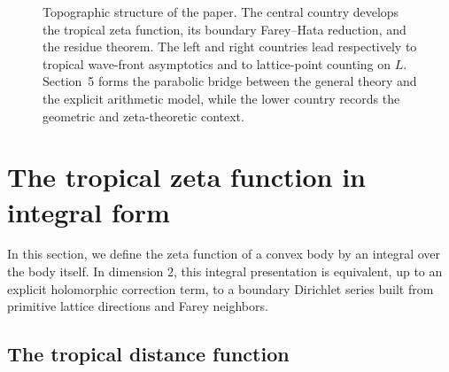 \documentclass[a4paper,american,11pt]{amsart}
\theoremstyle{plain}
\theoremstyle{definition}
\begin{document}
\begin{landscape}
\begin{figure}[p]
{%
}

\caption[Topographic structure of the paper]{
Topographic structure of the paper. The central country develops the tropical
zeta function, its boundary Farey--Hata reduction, and the residue theorem.
The left and right countries lead respectively to tropical wave-front
asymptotics and to lattice-point counting on \(L\). Section~5 forms the
parabolic bridge between the general theory and the explicit arithmetic
model, while the lower country records the geometric and zeta-theoretic
context.
}
\label{fig:structureofpaper}

\end{figure}
\endgroup
\end{landscape}
\clearpage

\section{The tropical zeta function in integral form}\label{sec1}

In this section, we define the zeta function of a convex body by an integral
over the body itself. In dimension \(2\), this integral presentation is
equivalent, up to an explicit holomorphic correction term, to a boundary
Dirichlet series built from primitive lattice directions and Farey neighbors.

\subsection{The tropical distance function}
\end{document}
